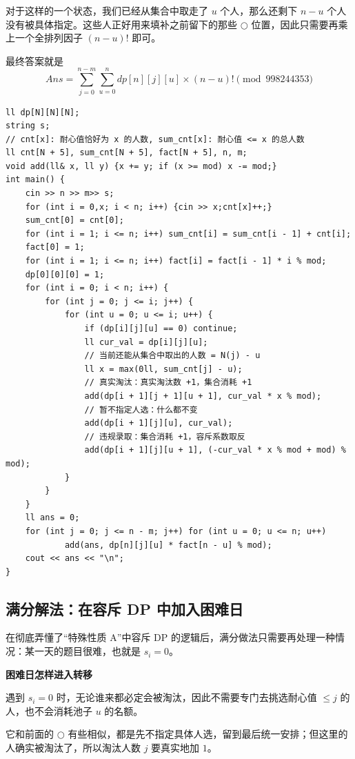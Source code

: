 \documentclass{book}
\newcommand{\FreeTake}{\ensuremath{\bigcirc}}
\begin{document}
对于这样的一个状态，我们已经从集合中取走了 $u$ 个人，那么还剩下 $n-u$ 个人没有被具体指定。这些人正好用来填补之前留下的那些 $\FreeTake$ 位置，因此只需要再乘上一个全排列因子 $(n-u)!$ 即可。

最终答案就是
\[
Ans = \sum_{j=0}^{n-m} \sum_{u=0}^{n} dp[n][j][u]\times (n-u)! \pmod{998244353}
\]

\begin{lstlisting}[style = code]
ll dp[N][N][N];
string s;
// cnt[x]: 耐心值恰好为 x 的人数, sum_cnt[x]: 耐心值 <= x 的总人数
ll cnt[N + 5], sum_cnt[N + 5], fact[N + 5], n, m;
void add(ll& x, ll y) {x += y; if (x >= mod) x -= mod;}
int main() {
    cin >> n >> m>> s;
    for (int i = 0,x; i < n; i++) {cin >> x;cnt[x]++;}
    sum_cnt[0] = cnt[0];
    for (int i = 1; i <= n; i++) sum_cnt[i] = sum_cnt[i - 1] + cnt[i];
    fact[0] = 1;
    for (int i = 1; i <= n; i++) fact[i] = fact[i - 1] * i % mod;
    dp[0][0][0] = 1;
    for (int i = 0; i < n; i++) {
        for (int j = 0; j <= i; j++) {
            for (int u = 0; u <= i; u++) {
                if (dp[i][j][u] == 0) continue;
                ll cur_val = dp[i][j][u];
                // 当前还能从集合中取出的人数 = N(j) - u
                ll x = max(0ll, sum_cnt[j] - u);
                // 真实淘汰：真实淘汰数 +1，集合消耗 +1
                add(dp[i + 1][j + 1][u + 1], cur_val * x % mod);
                // 暂不指定人选：什么都不变
                add(dp[i + 1][j][u], cur_val);
                // 违规录取：集合消耗 +1，容斥系数取反
                add(dp[i + 1][j][u + 1], (-cur_val * x % mod + mod) % mod);
            }
        }
    }
    ll ans = 0;
    for (int j = 0; j <= n - m; j++) for (int u = 0; u <= n; u++) 
            add(ans, dp[n][j][u] * fact[n - u] % mod);
    cout << ans << "\n";
}
\end{lstlisting}

\newpage
\subsection{满分解法：在容斥 DP 中加入困难日}

在彻底弄懂了“特殊性质 A”中容斥 DP 的逻辑后，满分做法只需要再处理一种情况：某一天的题目很难，也就是 $s_i = 0$。

\par\medskip
\noindent\textbf{困难日怎样进入转移}
\par\medskip
遇到 $s_i = 0$ 时，无论谁来都必定会被淘汰，因此不需要专门去挑选耐心值 $\le j$ 的人，也不会消耗池子 $u$ 的名额。

它和前面的 $\FreeTake$ 有些相似，都是先不指定具体人选，留到最后统一安排；但这里的人确实被淘汰了，所以淘汰人数 $j$ 要真实地加 $1$。
\end{document}
